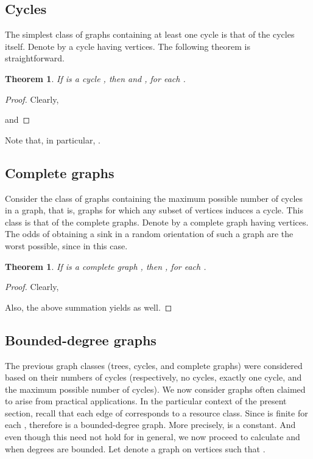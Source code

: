 \documentclass{article}
\newtheorem{thm}[lem]{Theorem}
\begin{document}
\subsection{Cycles}

The simplest class of graphs containing at least one cycle is that of the cycles
itself. Denote by  a cycle having  vertices. The following theorem is
straightforward.

\begin{thm}
\label{PXEXCn}
If  is a cycle , then  and
, for each .
\end{thm}

\begin{proof}
Clearly, 

and

\end{proof}

Note that, in particular, .

\subsection{Complete graphs}

Consider the class of graphs containing the maximum possible number of cycles in
a graph, that is, graphs for which any subset of vertices induces a cycle. This
class is that of the complete graphs. Denote by  a complete graph having
 vertices. The odds of obtaining a sink in a random orientation of such a
graph are the worst possible, since  in this case.

\begin{thm}
\label{PXEXKn}
If  is a complete graph , then
, for each .
\end{thm}

\begin{proof}
Clearly, 
 
Also, the above summation yields  as well.
\end{proof}

\subsection{Bounded-degree graphs}

The previous graph classes (trees, cycles, and complete graphs) were considered
based on their numbers of cycles (respectively, no cycles, exactly one cycle,
and the maximum possible number of cycles). We now consider graphs often claimed
to arise from practical applications. In the particular context of the present
section, recall that each edge of  corresponds to a resource class. Since
 is finite for each ,
therefore  is a bounded-degree graph. More precisely,
 is a constant. And even
though this need not hold for  in general, we now proceed to calculate
 and  when degrees are bounded. Let 
denote a graph  on  vertices such that .
\end{document}
